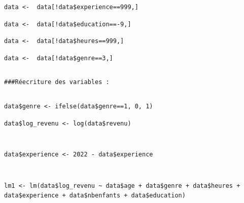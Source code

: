 \documentclass[a4paper, french, 11 pt]{article}\usepackage[]{graphicx}\usepackage[]{xcolor}
\makeatletter
\newenvironment{kframe}{%
 \def\at@end@of@kframe{}%
 \ifinner\ifhmode%
  \def\at@end@of@kframe{\end{minipage}}%
  \begin{minipage}{\columnwidth}%
 \fi\fi%
 \def\FrameCommand##1{\hskip\@totalleftmargin \hskip-\fboxsep
 \colorbox{shadecolor}{##1}\hskip-\fboxsep
     \hskip-\linewidth \hskip-\@totalleftmargin \hskip\columnwidth}%
 \MakeFramed {\advance\hsize-\width
   \@totalleftmargin\z@ \linewidth\hsize
   \@setminipage}}%
 {\par\unskip\endMakeFramed%
 \at@end@of@kframe}
\newenvironment{knitrout}{}{} %
\makeatother
\begin{document}
\begin{knitrout}
\begin{kframe}
\begin{lstlisting}[basicstyle=\ttfamily,breaklines=true]
data <-  data[!data$experience==999,]\end{lstlisting}
\begin{lstlisting}[basicstyle=\ttfamily,breaklines=true]
data <-  data[!data$education==-9,]\end{lstlisting}
\begin{lstlisting}[basicstyle=\ttfamily,breaklines=true]
data <-  data[!data$heures==999,]\end{lstlisting}
\begin{lstlisting}[basicstyle=\ttfamily,breaklines=true]
data <-  data[!data$genre==3,]\end{lstlisting}
\begin{lstlisting}[basicstyle=\ttfamily,breaklines=true]
\end{lstlisting}
\begin{lstlisting}[basicstyle=\ttfamily,breaklines=true]
###Réecriture des variables : \end{lstlisting}
\begin{lstlisting}[basicstyle=\ttfamily,breaklines=true]
\end{lstlisting}
\begin{lstlisting}[basicstyle=\ttfamily,breaklines=true]
data$genre <- ifelse(data$genre==1, 0, 1)\end{lstlisting}
\begin{lstlisting}[basicstyle=\ttfamily,breaklines=true]
data$log_revenu <- log(data$revenu)\end{lstlisting}
\begin{lstlisting}[basicstyle=\ttfamily,breaklines=true]
\end{lstlisting}
\begin{lstlisting}[basicstyle=\ttfamily,breaklines=true]
\end{lstlisting}
\begin{lstlisting}[basicstyle=\ttfamily,breaklines=true]
data$experience <- 2022 - data$experience\end{lstlisting}
\begin{lstlisting}[basicstyle=\ttfamily,breaklines=true]
\end{lstlisting}
\begin{lstlisting}[basicstyle=\ttfamily,breaklines=true]
\end{lstlisting}
\begin{lstlisting}[basicstyle=\ttfamily,breaklines=true]
lm1 <- lm(data$log_revenu ~ data$age + data$genre + data$heures + data$experience + data$nbenfants + data$education)\end{lstlisting}

\end{kframe}
\end{knitrout}
\end{document}
